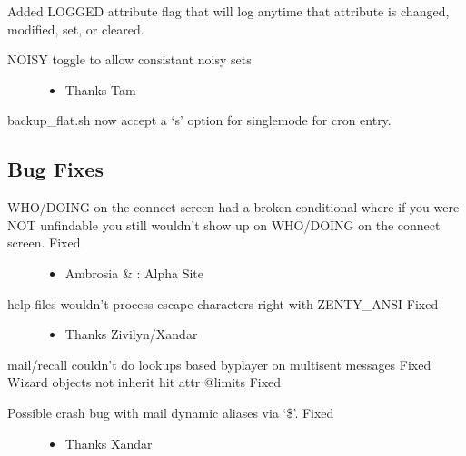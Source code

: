 \documentclass[letterpaper,10pt,english]{sphinxmanual}
\begin{document}
\sphinxAtStartPar
Added LOGGED attribute flag that will log anytime that attribute is changed, modified, set, or cleared.
\begin{description}
\item[{NOISY toggle to allow consistant noisy sets}] \leavevmode\begin{itemize}
\item {} 
\sphinxAtStartPar
Thanks Tam

\end{itemize}

\end{description}

\sphinxAtStartPar
backup\_flat.sh now accept a ‘\sphinxhyphen{}s’ option for single\sphinxhyphen{}mode for cron entry.


\subsection{Bug Fixes}
\label{\detokenize{changelog:id3}}\begin{description}
\item[{WHO/DOING on the connect screen had a broken conditional where if you were NOT unfindable you still wouldn’t show up on WHO/DOING on the connect screen.  \sphinxhyphen{} Fixed}] \leavevmode\begin{itemize}
\item {} 
\sphinxAtStartPar
Ambrosia \& : Alpha Site

\end{itemize}

\item[{help files wouldn’t process escape characters right with ZENTY\_ANSI \sphinxhyphen{} Fixed}] \leavevmode\begin{itemize}
\item {} 
\sphinxAtStartPar
Thanks Zivilyn/Xandar

\end{itemize}

\end{description}

\sphinxAtStartPar
mail/recall couldn’t do lookups based by\sphinxhyphen{}player on multi\sphinxhyphen{}sent messages \sphinxhyphen{} Fixed
Wizard objects not inherit hit attr @limits \sphinxhyphen{} Fixed
\begin{description}
\item[{Possible crash bug with mail dynamic aliases via ‘\$’.  \sphinxhyphen{} Fixed}] \leavevmode\begin{itemize}
\item {} 
\sphinxAtStartPar
Thanks Xandar

\end{itemize}

\end{description}
\end{document}
